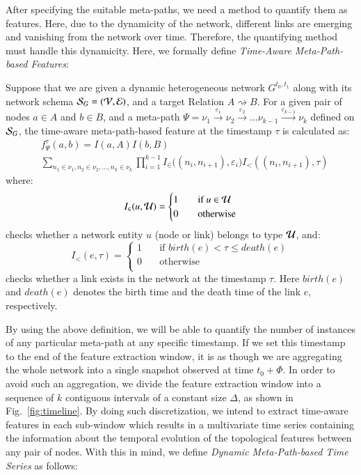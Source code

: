 After specifying the suitable meta-paths, we need a method to quantify them as features. Here, due to the dynamicity of the network, different links are emerging and vanishing from the network over time. Therefore, the quantifying method must handle this dynamicity. Here, we formally define \emph{Time-Aware Meta-Path-based Features}:

\begin{definition}
	Suppose that we are given a dynamic heterogeneous network $G^{t_0,t_1}$ along with its network schema $\mathcal{S}_G=(\mathcal{V}, \mathcal{E})$, and a target Relation $A\rightsquigarrow B$. For a given pair of nodes $a\in A$ and $b\in B$, and a meta-path $\Psi=\nu_1\xrightarrow{\varepsilon_1}\nu_2\xrightarrow{\varepsilon_2}\dots\nu_{k-1}\xrightarrow{\varepsilon_{k-1}}\nu_k$ defined on $\mathcal{S}_G$, the time-aware meta-path-based feature at the timestamp $\tau$ is calculated as:
	\begin{equation}
		\begin{split}
			&f_{\Psi}^\tau(a,b)=I(a,A)I(b,B)\\
			&\sum_{n_1\in\nu_1,n_2\in\nu_2,\dots,n_k\in\nu_k}\prod_{i=1}^{k-1}I_\in\Big((n_i,n_{i+1}),\varepsilon_i\Big)I_<\left((n_i,n_{i+1}),\tau\right)
		\end{split}
	\end{equation}
	where:
	\[
	I_\in(u,\mathcal{U})=
	\begin{cases}
	1&\quad\text{if } u\in \mathcal{U}\\
	0&\quad\text{otherwise}\\
	\end{cases}
	\]
	checks whether a network entity $u$ (node or link) belongs to type $\mathcal{U}$, and:
	\[
	I_<(e,\tau)=
	\begin{cases}
	1&\quad\text{if } birth(e) < \tau \le death(e)\\
	0&\quad\text{otherwise}\\
	\end{cases}
	\]
	checks whether a link exists in the network at the timestamp $\tau$. Here $birth(e)$ and $death(e)$ denotes the birth time and the death time of the link $e$, respectively.
\end{definition}

By using the above definition, we will be able to quantify the number of instances of any particular meta-path at any specific timestamp. If we set this timestamp to the end of the feature extraction window, it is as though we are aggregating the whole network into a single snapshot observed at time $t_0+\Phi$. In order to avoid such an aggregation, we divide the feature extraction window into a sequence of $k$ contiguous intervals of a constant size $\Delta$, as shown in Fig.~\ref{fig:timeline}. By doing such discretization, we intend to extract time-aware features in each sub-window which results in a multivariate time series containing the information about the temporal evolution of the topological features between any pair of nodes. With this in mind, we define \emph{Dynamic Meta-Path-based Time Series} as follows:

